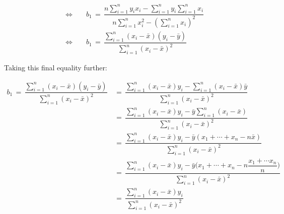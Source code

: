 \begin{align*}
    &\Longleftrightarrow \hspace{20pt} b_{1} \hspace{2pt} = \hspace{2pt} \dfrac{n\sum_{i = 1}^{n} y_{i}x_{i} - \sum_{i = 1}^{n} y_{i} \sum_{i = 1}^{n} x_{i}}{n\sum_{i = 1}^{n} x_{i}^{2} - (\sum_{i = 1}^{n} x_{i})^{2}} \\[1ex]
    &\Longleftrightarrow \hspace{20pt} b_{1} \hspace{2pt} = \hspace{2pt} \dfrac{\sum_{i = 1}^{n} (x_{i} - \bar{x})(y_{i} - \bar{y})}{\sum_{i = 1}^{n} (x_{i} - \bar{x})^{2}}
\end{align*}

Taking this final equality further:

\begin{align*}
    b_{1} \hspace{2pt} = \hspace{2pt} \dfrac{\sum_{i = 1}^{n} (x_{i} - \bar{x})(y_{i} - \bar{y})}{\sum_{i = 1}^{n} (x_{i} - \bar{x})^{2}} \hspace{2pt} &= \hspace{2pt} \dfrac{\sum_{i = 1}^{n} (x_{i} - \bar{x})y_{i} - \sum_{i = 1}^{n} (x_{i} - \bar{x})\bar{y}}{\sum_{i = 1}^{n} (x_{i} - \bar{x})^{2}} \\[1ex]
    &= \hspace{2pt} \dfrac{\sum_{i = 1}^{n} (x_{i} - \bar{x})y_{i} - \bar{y}\sum_{i = 1}^{n} (x_{i} - \bar{x})}{\sum_{i = 1}^{n} (x_{i} - \bar{x})^{2}} \\[1ex]
    &= \hspace{2pt} \dfrac{\sum_{i = 1}^{n} (x_{i} - \bar{x})y_{i} - \bar{y}(x_{1} + \cdots + x_{n} - n\bar{x})}{\sum_{i = 1}^{n} (x_{i} - \bar{x})^{2}} \\[1ex]
    &= \hspace{2pt} \dfrac{\sum_{i = 1}^{n} (x_{i} - \bar{x})y_{i} - \bar{y}\Big(x_{1} + \cdots + x_{n} - n\dfrac{x_{1} + \cdots x_{n}}{n}\Big)}{\sum_{i = 1}^{n} (x_{i} - \bar{x})^{2}} \\[1ex]
    &= \hspace{2pt} \dfrac{\sum_{i = 1}^{n} (x_{i} - \bar{x})y_{i}}{\sum_{i = 1}^{n} (x_{i} - \bar{x})^{2}}
\end{align*}

